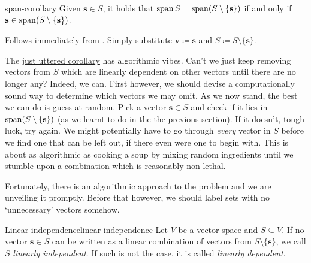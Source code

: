 \begin{corollary}{}{span-corollary}
 Given $\mathbf{s} \in S$, it holds that $\operatorname{span} S = \operatorname{span} (S \setminus
 \{\mathbf{s}\})$ if and only if $\mathbf{s} \in \operatorname{span} (S \setminus
 \{\mathbf{s}\})$.
\end{corollary}
\begin{corproof}
 Follows immediately from . Simply substitute
 $\mathbf{v} \coloneqq \mathbf{s}$ and $S \coloneqq S \setminus \{\mathbf{s}\}$.
\end{corproof}

The \hyperref[cor:span-corollary]{just uttered corollary} has algorithmic vibes.
Can't we just keep removing vectors from $S$ which are linearly dependent on
other vectors until there are no longer any? Indeed, we can. First however, we
should devise a computationally sound way to determine which vectors we may
omit. As we now stand, the best we can do is guess at random. Pick a vector
$\mathbf{s} \in S$ and check if it lies in $\operatorname{span} (S \setminus \{\mathbf{s}\})$
(as we learnt to do in the \hyperref[sec:subspaces-and-spans]{the previous
section}). If it doesn't, tough luck, try again. We might potentially have to go
through \emph{every} vector in $S$ before we find one that can be left out, if
there even were one to begin with. This is about as algorithmic as cooking a
soup by mixing random ingredients until we stumble upon a combination which is
reasonably non-lethal.

Fortunately, there is an algorithmic approach to the problem and we are
unveiling it promptly. Before that however, we should label sets with no
`unnecessary' vectors somehow.

\begin{definition}{Linear independence}{linear-independence}
 Let $V$ be a vector space and $S \subseteq V$. If no vector $\mathbf{s} \in S$
 can be written as a linear combination of vectors from $S \setminus
 \{\mathbf{s}\}$, we call $S$ \emph{linearly independent}. If such is not the
 case, it is called \emph{linearly dependent}.
\end{definition}

